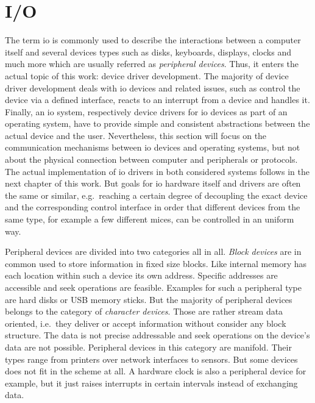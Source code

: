 \section{I/O}\label{sec:io} 
The term \acf{io} is commonly used to describe the interactions between a computer itself and several devices types such as disks, keyboards, displays, clocks and much more which are usually referred as \textit{peripheral devices}.
Thus, it enters the actual topic of this work: device driver development.
The majority of device driver development deals with \ac{io} devices and related issues, such as control the device via a defined interface, reacts to an interrupt from a device and handles it.
Finally, an \ac{io} system, respectively device drivers for \ac{io} devices as part of an operating system, have to provide simple and consistent abstractions between the actual device and the user\cite{tanenbaum-modern-operating-systems}.
Nevertheless, this section will focus on the communication mechanisms between \ac{io} devices and operating systems, but not about the physical connection between computer and peripherals or protocols.
The actual implementation of \ac{io} drivers in both considered systems follows in the next chapter of this work.
But goals for \ac{io} hardware itself and drivers are often the same or similar, e.g.\ reaching a certain degree of decoupling the exact device and the corresponding control interface in order that different devices from the same type, for example a few different mices, can be controlled in an uniform way\cite{tanenbaum-modern-operating-systems}.

Peripheral devices are divided into two categories all in all.
\textit{Block devices} are in common used to store information in fixed size blocks.
Like internal memory has each location within such a device its own address.
Specific addresses are accessible and seek operations are feasible.
Examples for such a peripheral type are hard disks or USB memory sticks\cite{tanenbaum-modern-operating-systems}.
But the majority of peripheral devices belongs to the category of \textit{character devices}.
Those are rather stream data oriented, i.e.\ they deliver or accept information without consider any block structure.
The data is not precise addressable and seek operations on the device's data are not possible.
Peripheral devices in this category are manifold.
Their types range from printers over network interfaces to sensors\cite{tanenbaum-modern-operating-systems}.
But some devices does not fit in the scheme at all.
A hardware clock is also a peripheral device for example, but it just raises interrupts in certain intervals instead of exchanging data.

